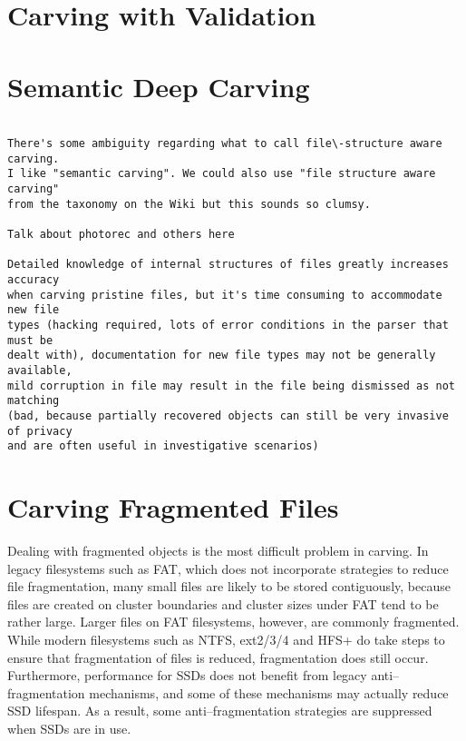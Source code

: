 \section{Carving with Validation}



\section{Semantic \/ Deep Carving}

\begin{Verbatim}

There's some ambiguity regarding what to call file\-structure aware carving. 
I like "semantic carving". We could also use "file structure aware carving" 
from the taxonomy on the Wiki but this sounds so clumsy.

Talk about photorec and others here

Detailed knowledge of internal structures of files greatly increases accuracy
when carving pristine files, but it's time consuming to accommodate new file
types (hacking required, lots of error conditions in the parser that must be 
dealt with), documentation for new file types may not be generally available, 
mild corruption in file may result in the file being dismissed as not matching
(bad, because partially recovered objects can still be very invasive of privacy
and are often useful in investigative scenarios)

\end{Verbatim}

\section{Carving Fragmented Files}

Dealing with fragmented objects is the most difficult problem in carving.  In legacy filesystems such as FAT, which does not incorporate strategies to reduce file fragmentation, many small files are likely to be stored contiguously, because files are created on cluster boundaries and cluster sizes under FAT tend to be rather large.  Larger files on FAT filesystems, however, are commonly fragmented\cite{dfrws2007:SimsonLGarfinkel}.  While modern filesystems such as NTFS, ext2/3/4 and HFS+ do take steps to ensure that fragmentation of files is reduced, fragmentation does still occur.  Furthermore, performance for SSDs does not benefit from legacy anti--fragmentation mechanisms, and some of these mechanisms may actually reduce SSD lifespan.  As a result, some anti--fragmentation strategies are suppressed when SSDs are in use.  

